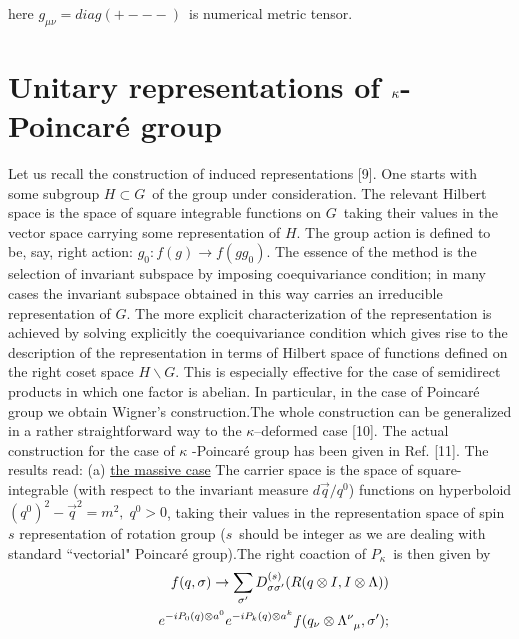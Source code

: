 \documentclass[a4paper,a4paper]{article}
\begin{document}
here $g_{\mu \nu}=diag(+---)$\ is numerical metric tensor.

\section{Unitary representations of $\protect\kappa$-Poincar\'{e}
group}

Let us recall the construction of induced representations [9]. One
starts with some subgroup $H \subset G$\ of the group under
consideration. The relevant Hilbert space is the space of  square
integrable functions on $G$\ taking their values in the vector
space carrying some representation
of $H$. %
 The group action is defined to be, say, right action: $%
g_{0}:f(g)\rightarrow f(gg_{0})$.  The essence of the method is
the selection of invariant subspace by imposing coequivariance
condition;  in many cases the invariant subspace obtained in this
way carries an irreducible representation  of $G$.  The more
explicit characterization of the representation is achieved by
solving explicitly the  coequivariance condition which gives rise
to the description of the representation in terms of Hilbert
space of functions defined on the right coset space $H \backslash
G$.  This is especially effective for the case of semidirect
products in which one factor is abelian. In particular, in the
case of Poincar\'{e} group we obtain Wigner's
construction.\newline The whole construction can be generalized
in a rather straightforward way to the $\kappa$--deformed  case
[10]. The actual construction for the
case of $\kappa$%
-Poincar\'{e} group has been given in Ref. [11]. The results read:
\newline (a) \underline{the massive case} \newline The carrier
space is the space of square-integrable (with respect to the
invariant measure $d\vec{q}/{q}^{0}$) functions on hyperboloid
$(q^{0})^{2}-%
\vec{q}^{2}=m^{2}, \;q^{0}>0$,  taking their values in the
representation space of spin $s$ representation of rotation group
($s$\ should be integer as we are dealing with standard
``vectorial"  Poincar\'{e} group).\newline The right coaction of
$P_{\kappa}$\ is then given by
\begin{eqnarray}\label{wz4}
&&  f(q,\sigma)\rightarrow
\sum_{\sigma '}D_{\sigma \sigma '}^{(s)}
(R(q\otimes I,I\otimes \Lambda))
\cr
&&
\quad
e^{-iP_{0}(q)\otimes
a^{0}}
e^{-iP_{k}(q)\otimes a^{k}}f(q_{\nu}\otimes \Lambda^{\nu}_{\;\;\mu} ,
\sigma '); \label{w1}
\end{eqnarray}
\end{document}
